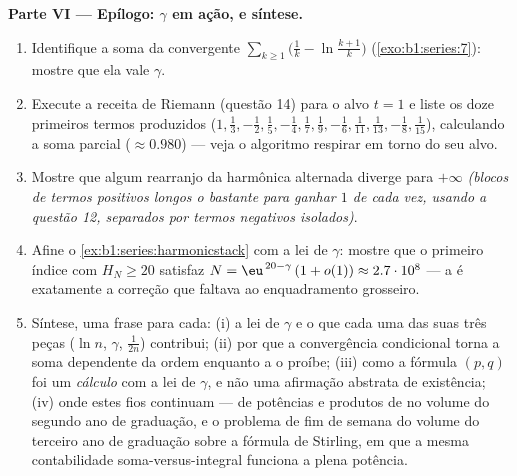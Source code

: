 \begin{problem}[{Problema de fim de semana --- $H_n = \ln n + \gamma +
\frac{1}{2n} + O(n^{-2})$, e rearranjar $1 - \frac12 +
\frac13 - \dots$ para $\frac{\ln 2}{2}$}]
\medskip
\noindent\textbf{Parte VI --- Epílogo: $\gamma$ em ação, e
síntese.}
\begin{enumerate}[resume]
  \item Identifique a soma da  convergente
        $\sum_{k\geq1} \bigl(\frac1k - \ln\frac{k+1}{k}\bigr)$
        (\cref{exo:b1:series:7}): mostre que ela vale $\gamma$.
  \item Execute a receita de Riemann (questão 14) para o alvo $t =
        1$
        e liste os doze primeiros termos produzidos ($1, \frac13,
        -\frac12, \frac15, -\frac14, \frac17, \frac19, -\frac16,
        \frac1{11}, \frac1{13}, -\frac18, \frac1{15}$),
        calculando a soma parcial ($\approx 0.980$) --- veja
        o algoritmo respirar em torno do seu alvo.
  \item Mostre que algum rearranjo da  harmônica alternada
        diverge para $+\infty$ \emph{(blocos de termos positivos
        longos o bastante para ganhar $1$ de cada vez, usando a
        questão 12, separados por termos negativos isolados)}.
  \item Afine o \cref{ex:b1:series:harmonicstack} com a lei de
        $\gamma$: mostre que o primeiro índice com $H_N \geq
        20$
        satisfaz $N = \eu^{\,20 - \gamma}\,(1 + o(1))
        \approx 2.7\cdot10^{8}$ --- a  é exatamente
        a correção que faltava ao enquadramento grosseiro.
  \item Síntese, uma frase para cada: (i) a lei de $\gamma$ e
        o que cada uma das suas três peças ($\ln n$, $\gamma$,
        $\frac{1}{2n}$) contribui; (ii) por que a convergência
        condicional torna a soma dependente da ordem enquanto a
         o proíbe; (iii) como a fórmula
        $(p,q)$ foi um \emph{cálculo} com a lei de $\gamma$, e
        não uma afirmação abstrata de existência; (iv) onde estes
        fios continuam ---  de potências e produtos de 
        no volume do segundo ano de graduação, e o problema de fim
        de semana do volume do terceiro ano de graduação sobre a
        fórmula de Stirling, em que a mesma contabilidade
        soma-versus-integral funciona a plena potência.
\end{enumerate}
\end{problem}
